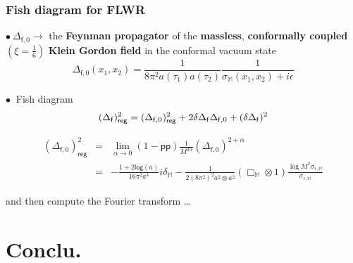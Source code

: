 \documentclass[9pt]{beamer}
\newcommand{\logar}{\mathsf{log}} %
\newcommand{\pp}{\mathsf{pp}} %
\newcommand{\Mbb}{\mathbb{M}}
\newcommand{\fsf}{\mathsf{f}}
\begin{document}
\begin{frame}

\frametitle{Fish diagram for FLWR} 

$\bullet \ \Delta_{\fsf,0} \to$ the \textbf{Feynman propagator} of the \textbf{massless}, \textbf{conformally coupled} $(\xi = \frac16)$ \textbf{Klein Gordon field} in the conformal vacuum state 
\begin{equation*}
\Delta_{\fsf,0}(x_1,x_2)=\frac{1}{8\pi^2 a(\tau_1)a(\tau_2)}\frac{1}{\sigma_{\Mbb}(x_1,x_2)+i\epsilon} 
\end{equation*}

$\bullet \ $ Fish diagram
\vspace*{-12pt}
\begin{equation*}
(\Delta_\fsf)^2_\mathsf{reg} = (\Delta_{\fsf,0})^2_\mathsf{reg} + 2 \delta\Delta_\fsf \Delta_{\fsf,0} + (\delta\Delta_\fsf)^2
\vspace*{-25pt}
\end{equation*}

\begin{eqnarray*}
(\Delta_{\fsf,0})^2_\mathsf{reg} &=& 
\lim_{\alpha\to 0} \left( 1 - \pp \right) \frac{1}{M^{2\alpha}} (\Delta_{\fsf,0})^{2+\alpha} \\
&=& - \frac{1+2\logar(a)}{16\pi^2 a^4} i\delta_\Mbb-\frac{1}{2(8\pi^2)^2 a^2\otimes a^2} \left(\Box_{\Mbb}\otimes 1\right)\frac{\log{M^2\sigma_{\epsilon,\Mbb}}}{\sigma_{\epsilon,\Mbb}}
\end{eqnarray*}

and then compute the Fourier transform \dots

\end{frame}

\section{Conclu.}
\end{document}
